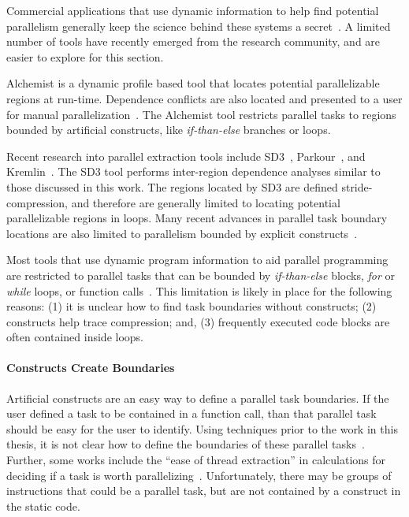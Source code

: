 {Commercial applications that use dynamic information to help find potential parallelism generally keep the science behind these systems a secret~\cite{cogswell:2010:eweek, vectorfabrics:11:ws}.  A limited number of tools have recently emerged from the research community, and are easier to explore for this section.

Alchemist is a dynamic profile based tool that locates potential parallelizable regions at run-time.  Dependence conflicts are also located and presented to a user for manual parallelization~\cite{zhang:09:cgo}.  The Alchemist tool restricts parallel tasks to regions bounded by artificial constructs, like \textit{if-than-else} branches or loops.

Recent research into parallel extraction tools include SD3~\cite{minjang:10:micro}, Parkour~\cite{jeon:2011:hotpar}, and Kremlin~\cite{garcia:2011:pldi}. The SD3 tool performs inter-region dependence analyses similar to those discussed in this work.  The regions located by SD3 are defined stride-compression, and therefore are generally limited to locating potential parallelizable regions in loops.  Many recent advances in parallel task boundary locations are also limited to parallelism bounded by explicit constructs~\cite{jeon:2011:hotpar, garcia:2011:pldi}.

Most tools that use dynamic program information to aid parallel programming are restricted to parallel tasks that can be bounded by \textit{if-than-else} blocks, \textit{for} or \textit{while} loops, or function calls~\cite{zhang:09:cgo, minjang:10:micro, jeon:2011:hotpar, garcia:2011:pldi}.  This limitation is likely in place for the following reasons: (1) it is unclear how to find task boundaries without constructs; (2) constructs help trace compression; and, (3) frequently executed code blocks are often contained inside loops.

\noindent\paragraph{Constructs Create Boundaries}

Artificial constructs are an easy way to define a parallel task boundaries.  If the user defined a task to be contained in a function call, than that parallel task should be easy for the user to identify. Using techniques prior to the work in this thesis, it is not clear how to define the boundaries of these parallel tasks~\cite{jeon:2011:hotpar, garcia:2011:pldi}.  Further, some works include the ``ease of thread extraction'' in calculations for deciding if a task is worth parallelizing~\cite{garcia:2011:pldi}. Unfortunately, there may be groups of instructions that could be a parallel task, but are not contained by a construct in the static code.

}
